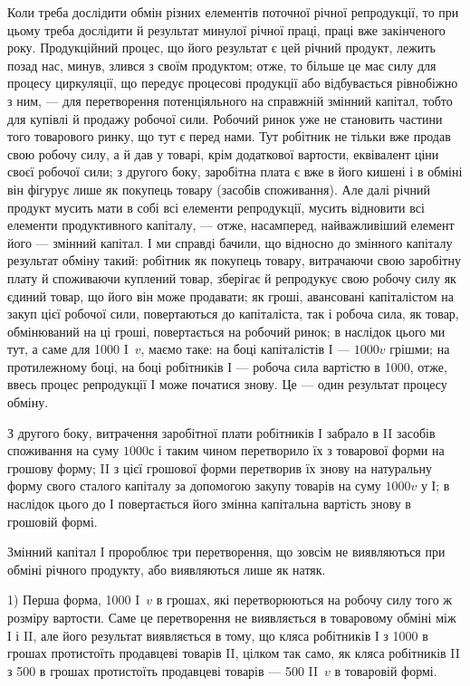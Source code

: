 Коли треба дослідити обмін різних елементів поточної річної репродукції,
то при цьому треба дослідити й результат минулої річної праці,
праці вже закінченого року. Продукційний процес, що його результат є
цей річний продукт, лежить позад нас, минув, злився з своїм продуктом;
отже, то більше це має силу для процесу циркуляції, що передує
процесові продукції або відбувається рівнобіжно з ним, — для перетворення
потенціяльного на справжній змінний капітал, тобто для купівлі
й продажу робочої сили. Робочий ринок уже не становить частини того
товарового ринку, що тут є перед нами. Тут робітник не тільки вже продав
свою робочу силу, а й дав у товарі, крім додаткової вартости,
еквівалент ціни своєї робочої сили; з другого боку, заробітна плата є
вже в його кишені і в обміні він фігурує лише як покупець товару
(засобів споживання). Але далі річний продукт мусить мати в собі всі
елементи репродукції, мусить відновити всі елементи продуктивного капіталу,
— отже, насамперед, найважливіший елемент його — змінний капітал.
І ми справді бачили, що відносно до змінного капіталу результат обміну
такий: робітник як покупець товару, витрачаючи свою заробітну плату
й споживаючи куплений товар, зберігає й репродукує свою робочу силу
як єдиний товар, що його він може продавати; як гроші, авансовані
капіталістом на закуп цієї робочої сили, повертаються до капіталіста, так
і робоча сила, як товар, обмінюваний на ці гроші, повертається на робочий
ринок; в наслідок цього ми тут, а саме для 1000 I~$v$, маємо таке:
на боці капіталістів І — $1000v$ грішми; на протилежному боці, на
боці робітників І — робоча сила вартістю в 1000, отже, ввесь процес
репродукції І може початися знову. Це — один результат процесу
обміну.

З другого боку, витрачення заробітної плати робітників І забрало
в II засобів споживання на суму $1000с$ і таким чином перетворило їх з
товарової форми на грошову форму; II з цієї грошової форми перетворив
їх знову на натуральну форму свого сталого капіталу за допомогою
закупу товарів на суму $1000v$ у І; в наслідок цього до І повертається
його змінна капітальна вартість знову в грошовій формі.

Змінний капітал І пророблює три перетворення, що зовсім не виявляються
при обміні річного продукту, або виявляються лише як натяк.

1) Перша форма, 1000 I~$v$ в грошах, які перетворюються на робочу
силу того ж розміру вартости. Саме це перетворення не виявляється в
товаровому обміні між І і II, але його результат виявляється в тому, що
кляса робітників І з 1000 в грошах протистоїть продавцеві товарів II,
цілком так само, як кляса робітників II з 500 в грошах протистоїть
продавцеві товарів — 500 II~$v$ в товаровій формі.


